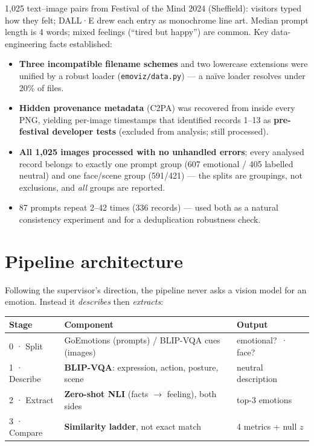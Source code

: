 \documentclass[11pt,a4paper]{article}
\begin{document}
1{,}025 text--image pairs from Festival of the Mind 2024 (Sheffield): visitors typed how they felt;
DALL·E drew each entry as monochrome line art. Median prompt length is 4 words; mixed feelings
(``tired but happy'') are common. Key data-engineering facts established:

\begin{itemize}
\item \textbf{Three incompatible filename schemes} and two lowercase extensions were unified by a
robust loader (\texttt{emoviz/data.py}) --- a na\"ive loader resolves under 20\% of files.
\item \textbf{Hidden provenance metadata} (C2PA) was recovered from inside every PNG, yielding
per-image timestamps that identified records 1--13 as \textbf{pre-festival developer tests}
(excluded from analysis; still processed).
\item \textbf{All 1{,}025 images processed with no unhandled errors}; every analysed record belongs to exactly one
prompt group (607 emotional / 405 labelled neutral) and one face/scene group (591/421) --- the splits are
groupings, not exclusions, and \emph{all} groups are reported.
\item 87 prompts repeat 2--42 times (336 records) --- used both as a natural consistency experiment
and for a deduplication robustness check.
\end{itemize}

\section{Pipeline architecture}
Following the supervisor's direction, the pipeline never asks a vision model for an emotion.
Instead it \emph{describes} then \emph{extracts}:

\begin{center}
\begin{tabular}{@{}lll@{}}
\toprule
\textbf{Stage} & \textbf{Component} & \textbf{Output}\\
\midrule
0 · Split & GoEmotions (prompts) / BLIP-VQA cues (images) & emotional?\ · face?\\
1 · Describe & \textbf{BLIP-VQA}: expression, action, posture, scene & neutral description\\
2 · Extract & \textbf{Zero-shot NLI} (facts $\rightarrow$ feeling), both sides & top-3 emotions\\
3 · Compare & \textbf{Similarity ladder}, not exact match & 4 metrics + null $z$\\
\bottomrule
\end{tabular}
\end{center}
\end{document}
